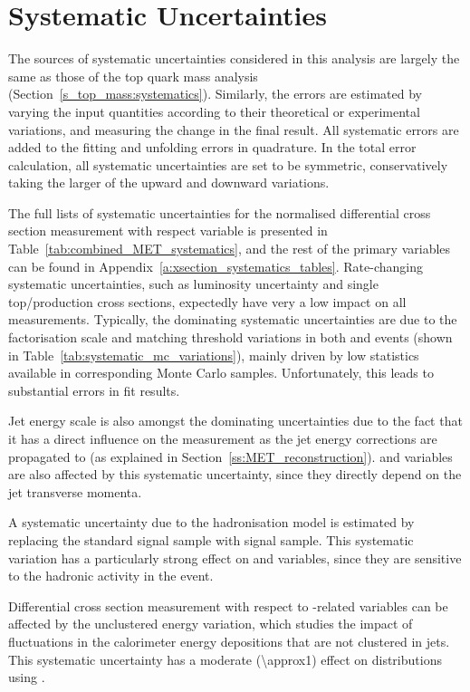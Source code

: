\section{Systematic Uncertainties}
\label{s_xsection:systematics}
The sources of systematic uncertainties considered in this analysis are largely the same as those of the top quark mass
analysis (Section~\ref{s_top_mass:systematics}). Similarly, the errors are estimated by varying the input quantities
according to their theoretical or experimental variations, and measuring the change in the final result. All systematic
errors are added to the fitting and unfolding errors in quadrature. In the total error calculation, all systematic
uncertainties are set to be symmetric, conservatively taking the larger of the upward and downward variations.

The full lists of systematic uncertainties for the normalised differential cross section measurement with respect \MET
variable is presented in Table~\ref{tab:combined_MET_systematics}, and the rest of the primary variables can be found in
Appendix~\ref{a:xsection_systematics_tables}. Rate-changing systematic uncertainties, such as luminosity uncertainty and
single top/\ttbar production cross sections, expectedly have very a low impact on all measurements. Typically, the
dominating systematic uncertainties are due to the factorisation scale and matching threshold variations in both \VpJets
and \ttbar events (shown in Table~\ref{tab:systematic_mc_variations}), mainly driven by low statistics available in
corresponding Monte Carlo samples. Unfortunately, this leads to substantial errors in fit results.

Jet energy scale is also amongst the dominating uncertainties due to the fact that it has a direct influence on the \MET
measurement as the jet energy corrections are propagated to \MET (as explained in Section~\ref{ss:MET_reconstruction}).
\HT and \ST variables are also affected by this systematic uncertainty, since they directly depend on the jet transverse
momenta.

A systematic uncertainty due to the hadronisation model is estimated by replacing the standard \MADGRAPH \ttbar signal
sample with \MCATNLO signal sample. This systematic variation has a particularly strong effect on \HT and \ST variables,
since they are sensitive to the hadronic activity in the event.

Differential cross section measurement with respect to \MET-related variables can be affected by the unclustered energy
variation, which studies the impact of fluctuations in the calorimeter energy depositions that are not clustered in
jets. This systematic uncertainty has a moderate (\SI{\approx1}{\pc}) effect on distributions using \MET.


